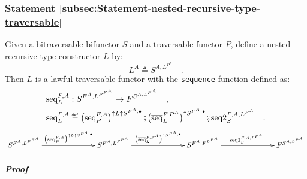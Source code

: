 \subsubsection{Statement \label{subsec:Statement-nested-recursive-type-traversable}\ref{subsec:Statement-nested-recursive-type-traversable}}

Given a bitraversable bifunctor $S$ and a traversable functor $P$,
define a nested recursive type constructor $L$ by:
\[
L^{A}\triangleq S^{A,L^{P^{A}}}\quad.
\]
Then $L$ is a lawful traversable functor with the \lstinline!sequence!
function defined as:
\begin{align*}
 & \text{seq}_{L}^{F,A}:S^{F^{A},L^{P^{F^{A}}}}\rightarrow F^{S^{A,L^{P^{A}}}}\quad,\\
 & \text{seq}_{L}^{F,A}\triangleq\big(\text{seq}_{P}^{F,A}\big)^{\uparrow L\uparrow S^{F^{A},\bullet}}\bef\big(\overline{\text{seq}}_{L}^{F,P^{A}}\big)^{\uparrow S^{F^{A},\bullet}}\bef\text{seq2}_{S}^{F,A,L^{P^{A}}}\quad.
\end{align*}
\[
\xymatrix{\xyScaleY{1.4pc}\xyScaleX{6pc}S^{F^{A},L^{P^{F^{A}}}}\ar[r]\sp(0.5){\big(\text{seq}_{P}^{F,A}\big)^{\uparrow L\uparrow S^{F^{A},\bullet}}} & S^{F^{A},L^{F^{P^{A}}}}\ar[r]\sp(0.5){\big(\overline{\text{seq}}_{L}^{F,P^{A}}\big)^{\uparrow S^{F^{A},\bullet}}} & S^{F^{A},F^{L^{P^{A}}}}\ar[r]\sp(0.5){\text{seq2}_{S}^{F,A,L^{P^{A}}}} & F^{S^{A,L^{P^{A}}}}}
\]


\subparagraph{Proof}

